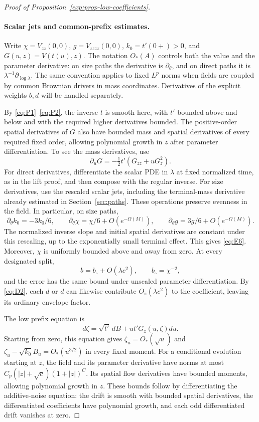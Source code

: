 \begin{proof}[Proof of Proposition~\ref{exp:prop-low-coefficients}]
\paragraph{Scalar jets and common-prefix estimates.}
Write
\(\chi=V_{zz}(0,0)\), \(g=V_{zzzz}(0,0)\),
\(k_0=t'(0+)>0\), and \(G(u,z)=V(t(u),z)\).
The notation \(O_*(A)\) controls both the value and the parameter
derivative: on size paths the derivative is \(\partial_\theta\),
and on direct paths it is \(\lambda^{-1}\partial_{\log\lambda}\).
The same convention applies to fixed \(L^p\) norms when fields are
coupled by common Brownian drivers in mass coordinates. Derivatives
of the explicit weights \(b,d\) will be handled separately.

By \eqref{eq:P1}--\eqref{eq:P2}, the inverse \(t\) is smooth here,
with \(t'\) bounded above and below and with the required higher
derivatives bounded. The positive-order spatial derivatives of \(G\)
also have bounded mass and spatial derivatives of every required
fixed order, allowing polynomial growth in \(z\) after parameter
differentiation. To see the mass derivatives, use
\[
 \partial_uG=-\tfrac12t'(G_{zz}+uG_z^2).
\]
For direct derivatives, differentiate the scalar PDE in \(\lambda\)
at fixed normalized time, as in the lift proof, and then compose with
the regular inverse. For size derivatives, use the rescaled scalar
jets, including the terminal-mass derivative already estimated in
Section~\ref{sec:paths}. These operations preserve evenness in the
field. In particular, on size paths,
\[
 \partial_\theta k_0=-3 k_0/6,\qquad
 \partial_\theta\chi=\chi/6+O(e^{-\Omega(M)}),\qquad
 \partial_\theta g=3g/6+O(e^{-\Omega(M)}).                              \tag{E6}\label{eq:E6}
\]
The normalized inverse slope and initial spatial derivatives are
constant under this rescaling, up to the exponentially small terminal
effect. This gives \eqref{eq:E6}. Moreover, \(\chi\) is uniformly
bounded above and away from zero. At every designated split,
\[
 b=b_\circ+O(\lambda c^2),\qquad b_\circ=\chi^{-2},
\]
and the error has the same bound under unscaled parameter
differentiation. By \eqref{eq:D2}, each \(d\) or \(\dot d\) can
likewise contribute \(O_\diamond(\lambda c^2)\) to the coefficient,
leaving its ordinary envelope factor.

The low prefix equation is
\[
 d\zeta=\sqrt{t'}\,dB+u t'G_z(u,\zeta)du.
\]
Starting from zero, this equation gives
\(\zeta_u=O_*(\sqrt u)\) and
\(\zeta_u-\sqrt{k_0}B_u=O_*(u^{3/2})\) in every fixed moment.
For a conditional evolution starting at \(z\), the field and its
parameter derivative have norms at most
\(C_p(|z|+\sqrt c)(1+|z|)^C\). Its spatial flow derivatives have
bounded moments, allowing polynomial growth in \(z\). These bounds
follow by differentiating the additive-noise equation: the drift is
smooth with bounded spatial derivatives, the differentiated
coefficients have polynomial growth, and each odd differentiated
drift vanishes at zero.


\end{proof}

